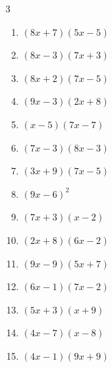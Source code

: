 \begin{multicols}{3}
\begin{enumerate}
  \item $(8x+7)(5x-5)$


  \item $(8x-3)(7x+3)$


  \item $(8x+2)(7x-5)$


  \item $(9x-3)(2x+8)$


  \item $(x-5)(7x-7)$


  \item $(7x-3)(8x-3)$


  \item $(3x+9)(7x-5)$


\columnbreak %

  \item $(9x-6)^{2}$


  \item $(7x+3)(x-2)$


  \item $(2x+8)(6x-2)$


  \item $(9x-9)(5x+7)$


  \item $(6x-1)(7x-2)$


  \item $(5x+3)(x+9)$


  \item $(4x-7)(x-8)$


  \item $(4x-1)(9x+9)$


\end{enumerate}
\end{multicols}
